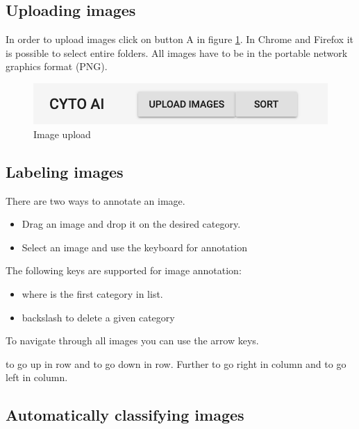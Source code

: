 \subsection{Uploading images}
In order to upload images click on button A in figure \ref{fig:ImageUpload}.
In Chrome and Firefox it is possible to select entire folders.
All images have to be in the portable network graphics format (PNG).

\begin{figure}[H]
	\centering
	\includegraphics[scale=0.6]{bilder/cyto/UploadImages.png}
	\caption{Image upload}
	\label{fig:ImageUpload}
\end{figure}


\subsection{Labeling images}

There are two ways to annotate an image.

\begin{itemize}
	\item Drag an image and drop it on the desired category.
	\item Select an image and use the keyboard for annotation
\end{itemize}

The following keys are supported for image annotation:

\begin{itemize}
	\item {}      
	   where  is the first category in list.
	\item \keystroke{$\Leftarrow$} backslash to delete a given category
\end{itemize}

To navigate through all images you can use the arrow keys.

\keystroke{$\Uparrow$} to go up in row and 
\keystroke{$\Downarrow$} to go down in row. Further \keystroke{$\Rightarrow$} to go right in column and \keystroke{$\Leftarrow$} to go left in column.


\subsection{Automatically classifying images}

